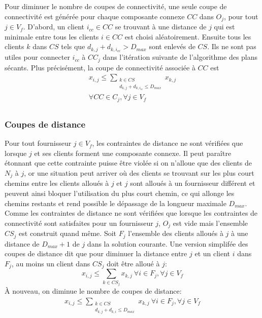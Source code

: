 \documentclass[letterpaper]{article}
\begin{document}
Pour diminuer le nombre de coupes de connectivité, une seule coupe de connectivité est générée pour chaque composante connexe $CC$ dans $O_{j}$, pour tout $j \in V_{f}$. D'abord, un client $i_{cc} \in CC$ se trouvant à une distance de $j$ qui est minimale entre tous les clients $i \in CC$ est choisi aléatoirement. Ensuite tous les clients $k$ dans $CS$ tels que $d_{k,j}+d_{k,i_{cc}}>D_{max}$ sont enlevés de $CS$. Ils ne sont pas utiles pour connecter $i_{cc}$ à $CC_{j}$ dans l'itération suivante de l'algorithme des plans sécants. Plus précisément, la coupe de connectivité associée à $CC$ est
\begin{equation}
\begin{aligned}
x_{i,j} \leq  \sum_{\substack{k \in CS \\d_{k,j}+d_{k,i_{cc}}\leq D_{max}}}{x_{k,j}} \\  
\forall CC \in C_{j}, \forall j \in V_{f}\\ 
\end{aligned}
\end{equation}
\subsubsection*{Coupes de distance}
Pour tout fournisseur $j \in V_{f}$, les contraintes de distance ne sont vérifiées que lorsque $j$ et ses clients forment une composante connexe. Il peut paraître étonnant que cette contrainte puisse être violée si on n'alloue que des clients de $N_{j}$ à $j$, or une situation peut arriver où des clients se trouvant sur les plus court chemins entre les clients alloués à $j$ et $j$ sont alloués à un fournisseur différent et peuvent ainsi bloquer l'utilisation du plus court chemin, ce qui allonge les chemins restants et rend possible le dépassage de la longueur maximale $D_{max}$.\newline \indent
Comme les contraintes de distance ne sont vérifiées que lorsque les contraintes de connectivité sont satisfaites pour un fournisseur $j$, $O_{j}$ est vide mais l'ensemble $CS_{j}$ est construit quand même. Soit $F_{j}$ l'ensemble des clients alloués à $j$ à une distance de $D_{max}+1$ de $j$ dans la solution courante.\newline \indent
Une version simplifée des coupes de distance dit que pour diminuer la distance entre $j$ et un client $i$ dans $F_{j}$, au moins un client dans $CS_{j}$ doit être alloué à $j$:
\begin{equation*}
x_{i,j} \leq \sum_{k \in CS_{j}}{x_{k,j}} \ \forall i \in F_{j}, \forall j \in V_{f}
\end{equation*}
À nouveau, on diminue le nombre de coupes de distance:
\begin{equation}
\begin{aligned}
x_{i,j} \leq \sum_{\substack{k \in CS \\d_{k,j}+d_{k,i}\leq D_{max}}}{x_{k,j}} \ \forall i \in F_{j}, \forall j \in V_{f}
\end{aligned}
\end{equation}
\end{document}
